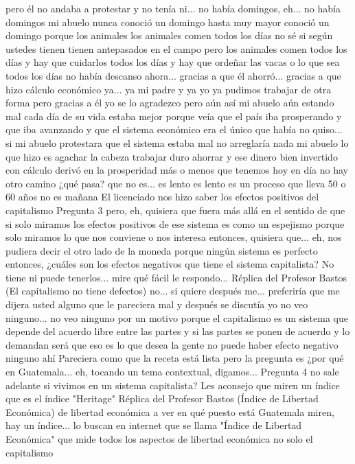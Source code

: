 pero él no andaba a protestar y no tenía ni... no había domingos, eh... no había domingos mi abuelo nunca conoció un domingo
hasta muy mayor conoció un domingo porque los animales los animales comen todos los días
no sé si según ustedes tienen tienen antepasados en el campo pero los animales comen todos los días y hay que cuidarlos todos los días
y hay que ordeñar las vacas o lo que sea todos los días no había descanso ahora... gracias a que él ahorró...
gracias a que hizo cálculo económico ya... ya mi padre y ya yo ya pudimos trabajar de otra forma
pero gracias a él yo se lo agradezco pero aún así mi abuelo aún estando mal cada día de su vida estaba mejor
porque veía que el país iba prosperando y que iba avanzando y que el sistema económico era el único que había
no quiso... si mi abuelo protestara que el sistema estaba mal no arreglaría nada mi abuelo lo que hizo es agachar la cabeza
trabajar duro ahorrar y ese dinero bien invertido con cálculo derivó en la prosperidad más o menos
que tenemos hoy en día no hay otro camino ¿qué pasa? que no es... es lento es lento es un proceso que lleva 50 o 60 años
no es mañana El licenciado nos hizo saber los efectos positivos del capitalismo
Pregunta 3
pero, eh, quisiera que fuera más allá en el sentido de que
si solo miramos los efectos positivos de ese sistema es como un espejismo porque solo miramos
lo que nos conviene o nos interesa entonces, quisiera que... eh, nos pudiera decir
el otro lado de la moneda porque ningún sistema es perfecto entonces, ¿cuáles son los efectos negativos
que tiene el sistema capitalista? No tiene ni puede tenerlos... mire qué fácil le respondo...
Réplica del Profesor Bastos (El capitalismo no tiene defectos)
no... si quiere después me... preferiría que me dijera usted alguno que le pareciera mal y después se discutía yo no veo ninguno...
no veo ninguno por un motivo porque el capitalismo es un sistema que depende del acuerdo libre entre las partes y si las partes se ponen de acuerdo
y lo demandan será que eso es lo que desea la gente no puede haber efecto negativo ninguno ahí
Pareciera como que la receta está lista pero la pregunta es ¿por qué en Guatemala... eh, tocando un tema contextual, digamos...
Pregunta 4
no sale adelante si vivimos en un sistema capitalista? Les aconsejo que miren un índice que es el índice "Heritage"
Réplica del Profesor Bastos (Índice de Libertad Económica)
de libertad económica a ver en qué puesto está Guatemala miren, hay un índice... lo buscan en internet
que se llama "Índice de Libertad Económica" que mide todos los aspectos de libertad económica no solo el capitalismo
